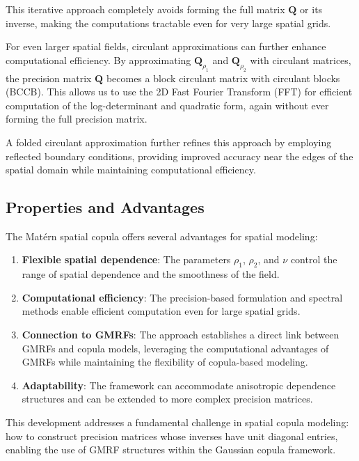 This iterative approach completely avoids forming the full matrix $\mathbf{Q}$ or its inverse, making the computations tractable even for very large spatial grids.

For even larger spatial fields, circulant approximations can further enhance computational efficiency. By approximating $\mathbf{Q}_{\rho_1}$ and $\mathbf{Q}_{\rho_2}$ with circulant matrices, the precision matrix $\mathbf{Q}$ becomes a block circulant matrix with circulant blocks (BCCB). This allows us to use the 2D Fast Fourier Transform (FFT) for efficient computation of the log-determinant and quadratic form, again without ever forming the full precision matrix.

A folded circulant approximation further refines this approach by employing reflected boundary conditions, providing improved accuracy near the edges of the spatial domain while maintaining computational efficiency.

\subsection{Properties and Advantages}
The Matérn spatial copula offers several advantages for spatial modeling:

\begin{enumerate}
\item \textbf{Flexible spatial dependence}: The parameters $\rho_1$, $\rho_2$, and $\nu$ control the range of spatial dependence and the smoothness of the field.

\item \textbf{Computational efficiency}: The precision-based formulation and spectral methods enable efficient computation even for large spatial grids.

\item \textbf{Connection to GMRFs}: The approach establishes a direct link between GMRFs and copula models, leveraging the computational advantages of GMRFs while maintaining the flexibility of copula-based modeling.

\item \textbf{Adaptability}: The framework can accommodate anisotropic dependence structures and can be extended to more complex precision matrices.
\end{enumerate}

This development addresses a fundamental challenge in spatial copula modeling: how to construct precision matrices whose inverses have unit diagonal entries, enabling the use of GMRF structures within the Gaussian copula framework.

